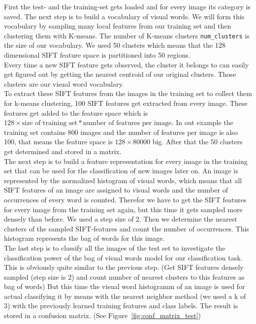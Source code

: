 \documentclass[subfigure,epsfig,fleqn,float,numbers=noenddot]{scrartcl}
\begin{document}
First the test- and the training-set gets loaded and for every image its category is saved. The next step is to build a vocabulary
of visual words. We will form this vocabulary by sampling many local features from our training set and then clustering them with K-means. The number of K-means clusters \texttt{num\_clusters} is the size of our vocabulary. We used 50 clusters which means that the 128 dimensional SIFT feature space is partitioned into 50 regions.\\
Every time a new SIFT feature gets observed, the cluster it belongs to can easily get figured out by getting the nearest centroid of our original clusters. Those clusters are our visual word vocabulary.\\
To extract these SIFT features from the images in the training set to collect them for k-means clustering, 100 SIFT features get extracted from every image. These features get added to the feature space which is $128 \times \mbox{size of training set}*\mbox{number of features per image}$. In out example the training set contains 800 images and the number of features per image is also 100, that means the feature space is $128 \times 80000$ big. After that the 50 clusters get determined and stored in a matrix.\\
The next step is to build a feature representation for every image in the training set that can be used for the classification of new images later on. An image is represented by the normalized histogram of visual words, which means that all SIFT features of an image are assigned to visual words and the number of occurrences of every word is counted. Therefor we have to get the SIFT features for every image from the training set again, but this time it gets sampled more densely than before. We used a step size of 2. Then we determine the nearest clusters of the sampled SIFT-features and count the number of occurrences. This histogram represents the bag of words for this image.\\
The last step is to classify all the images of the test set to investigate the classification power of the bag of visual words model for our classification task. This is obviously quite similar to the previous step. (Get SIFT features densely sampled (step size is 2) and count number of nearest clusters to this features as bag of words) But this time the visual word histogramm of an image is used for actual classifying it by means with the nearest neighbor method (we used a k of 3) with the previously learned training features and class labels. The result is stored in a confusion matrix. (See Figure~\ref{fig:conf_matrix_test})
\end{document}
